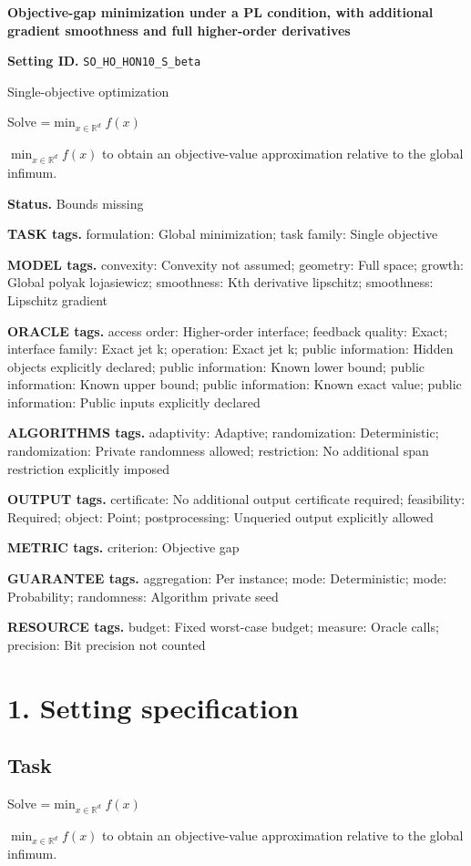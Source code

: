 \documentclass[10pt,a4paper]{article}
\newcommand{\AtlasMath}[1]{\par\begingroup\centering\setbox0=\hbox{$\displaystyle #1$}\ifdim\wd0>1.4\linewidth\typeout{ATLAS WIDE FORMULA: \the\wd0}\fi\ifdim\wd0>\linewidth\resizebox{\linewidth}{!}{\box0}\else\box0\fi\par\endgroup}
\newcommand{\AtlasInlineMath}[1]{\begingroup\setbox0=\hbox{$#1$}\ifdim\wd0>.4\linewidth\endgroup\AtlasMath{#1}\else\endgroup$#1$\fi}
\begin{document}
\raggedright

{\LARGE\bfseries\sffamily\color{AtlasNavy} Objective-gap minimization under a PL condition, with additional gradient smoothness and full higher-order derivatives\par}\vspace{5pt}
\textbf{Setting ID.} \texttt{SO\_\allowbreak{}HO\_\allowbreak{}HON10\_\allowbreak{}S\_\allowbreak{}beta}

Single-objective optimization

Solve \AtlasInlineMath{\min_{x\in \mathbb{R}^d}f(x)} to obtain an objective-value approximation relative to the global infimum.

\textbf{Status.} Bounds missing

\textbf{TASK tags.} formulation: Global minimization; task family: Single objective

\textbf{MODEL tags.} convexity: Convexity not assumed; geometry: Full space; growth: Global polyak lojasiewicz; smoothness: Kth derivative lipschitz; smoothness: Lipschitz gradient

\textbf{ORACLE tags.} access order: Higher-order interface; feedback quality: Exact; interface family: Exact jet k; operation: Exact jet k; public information: Hidden objects explicitly declared; public information: Known lower bound; public information: Known upper bound; public information: Known exact value; public information: Public inputs explicitly declared

\textbf{ALGORITHMS tags.} adaptivity: Adaptive; randomization: Deterministic; randomization: Private randomness allowed; restriction: No additional span restriction explicitly imposed

\textbf{OUTPUT tags.} certificate: No additional output certificate required; feasibility: Required; object: Point; postprocessing: Unqueried output explicitly allowed

\textbf{METRIC tags.} criterion: Objective gap

\textbf{GUARANTEE tags.} aggregation: Per instance; mode: Deterministic; mode: Probability; randomness: Algorithm private seed

\textbf{RESOURCE tags.} budget: Fixed worst-case budget; measure: Oracle calls; precision: Bit precision not counted

\section{1. Setting specification}
\subsection{Task}
Solve \AtlasInlineMath{\min_{x\in \mathbb{R}^d}f(x)} to obtain an objective-value approximation relative to the global infimum.
\end{document}
